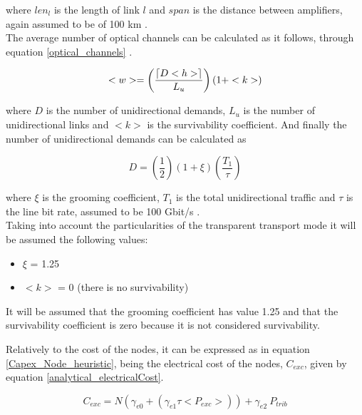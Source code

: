 \vspace{11pt}
\noindent
where $len_l$ is the length of link $l$ and $span$ is the distance between amplifiers, again assumed to be of 100 km \cite{anpinto2}.\\

\vspace{11pt}
The average number of optical channels can be calculated as it follows, through equation \ref{optical_channels} \cite{TiagoEsteves}.

\begin{equation}
<w> = \left( \frac{\lceil D \vspace{2pt} <h> \rceil}{L_u} \right) \left( 1 + <k>\right)
\label{optical_channels}
\end{equation}

\noindent
where $D$ is the number of unidirectional demands, $L_u$ is the number of unidirectional links and $<k>$ is the survivability coefficient.
And finally the number of unidirectional demands can be calculated as

\begin{equation}
D = \left(\frac{1}{2}\right) \left( 1 + \xi \right) \left(\frac{T_1}{\tau}\right)
\label{demands}
\end{equation}

\noindent
where $\xi$ is the grooming coefficient, $T_1$ is the total unidirectional traffic and $\tau$ is the line bit rate, assumed to be 100 Gbit/s \cite{TiagoEsteves}.\\

Taking into account the particularities of the transparent transport mode it will be assumed the following values:
\begin{itemize}
  \item $\xi$ = 1.25
  \item $<k>$ = 0 (there is no survivability)
\end{itemize}

It will be assumed that the grooming coefficient has value 1.25 and that the survivability coefficient is zero because it is not considered survivability.

\vspace{11pt}
Relatively to the cost of the nodes, it can be expressed as in equation \ref{Capex_Node_heuristic}, being the electrical cost of the nodes, $C_{exc}$, given by equation \ref{analytical_electricalCost}.

\begin{equation}
C_{exc} = N \left( \gamma_{e0} + \left( \gamma_{e1} \tau <P_{exc}> \right) \right) + \gamma_{e2} \ P_{trib}
\label{analytical_electricalCost}
\end{equation}

